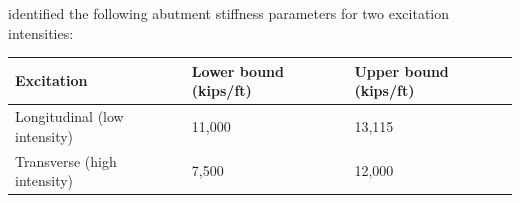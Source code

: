 


%
\textcite{goel1997evaluation} identified the following abutment
stiffness parameters for two excitation intensities:
%
\begin{table}[H]
\centering
\begin{tabular}{lll}
\toprule
{\textbf{Excitation}} & {\textbf{Lower bound (kips/ft)}} & {\textbf{Upper bound (kips/ft)}} \\
\midrule
Longitudinal (low intensity) & 11,000 & 13,115 \\
Transverse (high intensity) & 7,500 & 12,000 \\
\bottomrule
\end{tabular}
\end{table}



%     




